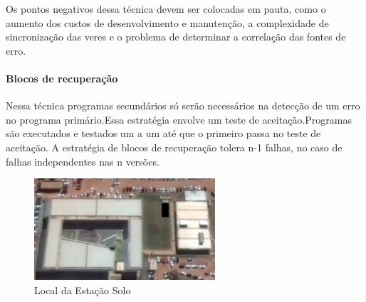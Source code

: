 Os pontos negativos dessa técnica devem ser colocadas em pauta, como o aumento dos custos de desenvolvimento e manutenção, a complexidade de sincronização das veres e o problema de determinar a correlação das fontes de erro.

\paragraph{Blocos de recuperação}

Nessa técnica programas secundários só serão necessários na detecção de um erro no programa primário.Essa estratégia envolve um teste de aceitação.Programas são executados e testados um a um até que o primeiro passa no teste de aceitação. A estratégia de blocos de recuperação tolera n-1 falhas, no caso de falhas independentes nas n versões.



\begin{figure}[H]
		\centering
		\includegraphics[width=0.6\textwidth]{figuras/estacaoSolo}
		\caption{Local da Estação Solo}
		\label{img:estacaoSoloLocal}
	\end{figure}
